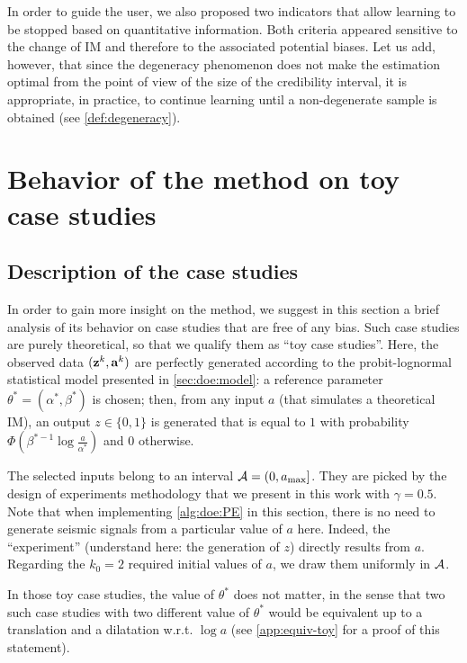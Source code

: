In order to guide the user, we also proposed two indicators that allow learning to be stopped based on quantitative information. Both criteria appeared sensitive to the change of IM and therefore to the associated potential biases. Let us add, however, that since the degeneracy phenomenon does not make the estimation optimal from the point of view of the size of the credibility interval, it is appropriate, in practice, to continue learning until a non-degenerate sample is obtained (see \cref{def:degeneracy}).



\section{Behavior of the method on toy case studies}\label{app:doe:toycases}

    \subsection{Description of the case studies}
    

    In order to gain more insight on the method, we suggest in this section a brief analysis of its behavior on case studies that are free of any bias. 
    Such case studies are purely theoretical, so that we qualify them as ``toy case studies''. Here, the observed data $(\mathbf{z}^k,\mathbf{a}^k)$ are perfectly generated according to the probit-lognormal statistical model presented in \cref{sec:doe:model}:
    a reference parameter $\theta^\ast=(\alpha^\ast,\beta^\ast)$ is chosen; then, from any input $a$ (that simulates a theoretical IM), an output $z\in\{0,1\}$ is generated that is equal to $1$ with probability $\Phi\left(\beta^{\ast -1}\log\frac{a}{\alpha^{\ast}}\right)$ and $0$ otherwise.
    
    The selected inputs belong to an interval $\mathcal{A}=(0,a_{\text{max}}]$.
    They are picked by the {design} of experiments methodology that we present in this work with $\gamma=0.5$. Note that when implementing \cref{alg:doe:PE} in this section, there is no need to generate seismic signals from a particular value of $a$ here. Indeed, the ``experiment'' (understand here: the generation of $z$) directly results from $a$.
    Regarding the $k_0=2$ required initial values of $a$, we draw them uniformly in $\mathcal{A}$.
    
    In those toy case studies, the value of $\theta^\ast$ does not matter, in the sense that two such case studies with two different value of $\theta^\ast$ would be equivalent up to a translation and a dilatation w.r.t. $\log a$ (see \cref{app:equiv-toy} for a proof of this statement).
    
